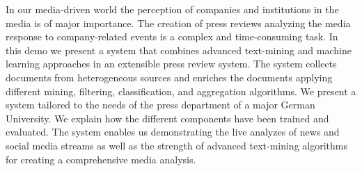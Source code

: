 In our media-driven world the perception of companies and institutions in the media is of major importance. The creation of press reviews analyzing the media response to company-related events is a complex and time-consuming task. In this demo we present a system that combines advanced text-mining and machine learning approaches in an extensible press review system. The system collects documents from heterogeneous sources and enriches the documents applying different mining, filtering, classification, and aggregation algorithms. We present a system tailored to the needs of the press department of a major German University. We explain how the different components have been trained and evaluated. The system enables us demonstrating the live analyzes of news and social media streams as well as the strength of advanced text-mining algorithms for creating a comprehensive media analysis.
